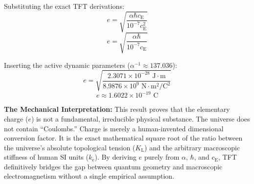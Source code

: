 Substituting the exact TFT derivations:
\begin{equation}
    e = \sqrt{\frac{\alpha\hbar c_{\mathrm{E}}}{10^{-7} c_{\mathrm{E}}^2}}
\end{equation}
\begin{equation}
    e = \sqrt{\frac{\alpha\hbar}{10^{-7} c_{\mathrm{E}}}}
\end{equation}

Inserting the active dynamic parameters ($\alpha^{-1} \approx 137.036$):
\begin{equation}
    e = \sqrt{\frac{2.3071 \times 10^{-28} \text{ J}\cdot\text{m}}{8.9876 \times 10^9 \text{ N}\cdot\text{m}^2/\text{C}^2}}
\end{equation}
\begin{equation}
    e \approx 1.6022 \times 10^{-19} \text{ C}
\end{equation}

\vspace{0.5em}
\noindent\textbf{The Mechanical Interpretation:} This result proves that the elementary charge ($e$) is not a fundamental, irreducible physical substance. The universe does not contain ``Coulombs.'' Charge is merely a human-invented dimensional conversion factor. It is the exact mathematical square root of the ratio between the universe's absolute topological tension ($K_{\mathrm{L}}$) and the arbitrary macroscopic stiffness of human SI units ($k_{\mathrm{e}}$). By deriving $e$ purely from $\alpha$, $\hbar$, and $c_{\mathrm{E}}$, TFT definitively bridges the gap between quantum geometry and macroscopic electromagnetism without a single empirical assumption.
